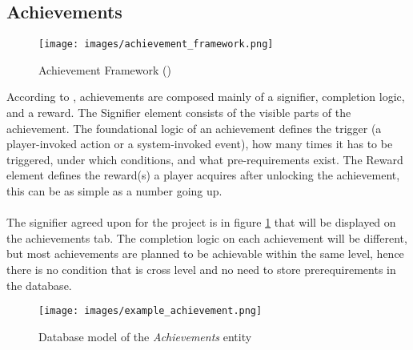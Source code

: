 \subsection{Achievements}
\begin{wrapfigure}{r}{0.5\textwidth}
    \centering
    \texttt{[image: images/achievement\_framework.png]}
    \caption{Achievement Framework (\cite{hamari2011framework})}
\end{wrapfigure}
According to \cite{hamari2011framework}, achievements are composed mainly of a signifier, completion logic, and a reward. The Signifier element consists of the visible parts of the achievement. The foundational logic of an achievement defines the trigger (a player-invoked action or a system-invoked event), how many times it has to be triggered,  under which conditions, and what pre-requirements exist. The Reward element defines the reward(s) a player acquires after unlocking the achievement, this can be as simple as a number going up.
\\\\
The signifier agreed upon for the project is in figure \ref{fig:achievements} that will be displayed on the achievements tab. The completion logic on each achievement will be different, but most achievements are planned to be achievable within the same level, hence there is no condition that is cross level and no need to store prerequirements in the database.
\begin{figure}[H]
    \centering
    \texttt{[image: images/example\_achievement.png]}
    \caption{Database model of the \textit{Achievements} entity}    
    \label{fig:achievements}
\end{figure}

